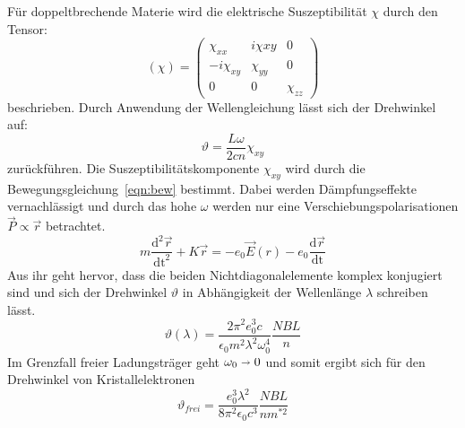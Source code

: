 Für doppeltbrechende Materie wird die elektrische Suszeptibilität $\chi$ durch den Tensor:
\begin{equation}
  (\chi)=
  \begin{pmatrix}
    \chi_{xx} & i\chi{xy} & 0\\
    -i\chi_{xy} & \chi_{yy} & 0\\
    0 & 0 & \chi_{zz}
  \end{pmatrix}
\end{equation}
beschrieben. Durch Anwendung der Wellengleichung lässt sich der Drehwinkel auf:
\begin{equation}
  \vartheta = \frac{L\omega}{2cn}\chi_{xy}
\end{equation}
zurückführen. Die Suszeptibilitätskomponente $\chi_{xy}$ wird durch die Bewegungsgleichung~\ref{eqn:bew} bestimmt. Dabei werden Dämpfungseffekte
vernachlässigt und durch das hohe $\omega$ werden nur eine Verschiebungspolarisationen $\vec{P} \propto \vec{r}$ betrachtet.
\begin{equation}
   m \frac{\text{d}^2\vec{r}}{\text{dt}^2} + K\vec{r} = -e_0\vec{E}(r) - e_0\frac{\text{d}\vec{r}}{\text{dt}}
   \label{eqn:bew}
\end{equation}
Aus ihr geht hervor, dass die beiden Nichtdiagonalelemente komplex konjugiert sind und sich der Drehwinkel $\vartheta$ in Abhängigkeit der
Wellenlänge $\lambda$ schreiben lässt.
\begin{equation}
  \vartheta(\lambda) = \frac{2\pi^2e_0^3c}{\epsilon_0 m^2\lambda^2\omega_0^4}\frac{NBL}{n}
\end{equation}
Im Grenzfall freier Ladungsträger geht $\omega_0 \shortrightarrow 0$ und somit ergibt sich für den Drehwinkel von Kristallelektronen
\begin{equation}
  \vartheta_{frei} = \frac{e_0^3\lambda^2}{8\pi^2\epsilon_0c^3}\frac{NBL}{n m^{*2}}
\end{equation}

